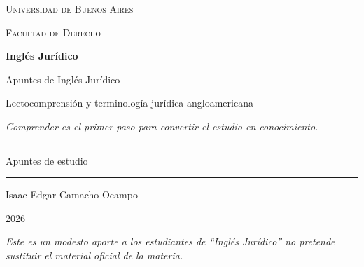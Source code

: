 \documentclass[12pt,oneside]{book}
\newcommand{\universidad}{Universidad de Buenos Aires}
\newcommand{\facultad}{Facultad de Derecho}
\newcommand{\materia}{Inglés Jurídico}
\newcommand{\titulo}{Apuntes de Inglés Jurídico}
\newcommand{\subtitulo}{Lectocomprensión y terminología jurídica angloamericana}
\newcommand{\autor}{Isaac Edgar Camacho Ocampo}
\newcommand{\anio}{2026}
\begin{document}
\begin{titlepage}

\thispagestyle{empty}

\begin{center}

\vspace*{1cm}

{\large \textsc{\universidad}}

\vspace{0.2cm}

{\large \textsc{\facultad}}

\vspace{3cm}

{\Huge \textbf{\materia}}

\vspace{1cm}

{\LARGE \titulo}

\vspace{0.4cm}

{\large \subtitulo}

\vspace{0.8cm}

\textit{\small Comprender es el primer paso para convertir el estudio en conocimiento.}

\vspace{1.2cm}

\rule{0.70\textwidth}{0.5pt}

\vspace{0.5cm}

{\large Apuntes de estudio}

\vspace{0.5cm}

\rule{0.70\textwidth}{0.5pt}

\vfill

{\large \autor}

\vspace{0.3cm}

{\large \anio}

\end{center}

\vfill

\begin{flushleft}
\textit{Este es un modesto aporte a los estudiantes de ``Inglés Jurídico'' no pretende sustituir el material oficial de la materia.}
\end{flushleft}

\end{titlepage}
\end{document}
